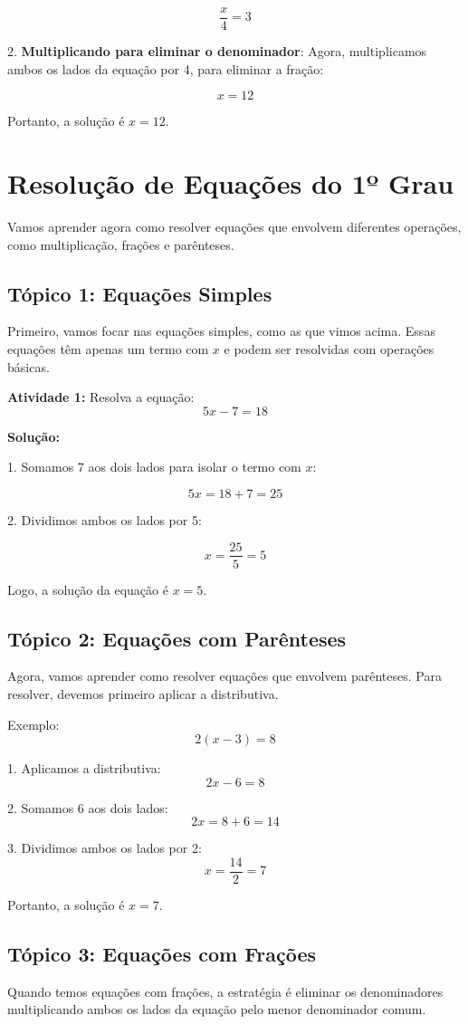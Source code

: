 \documentclass[11pt]{article}
\begin{document}
\begin{multicols}{2}
\[
\frac{x}{4} = 3
\]

2. \textbf{Multiplicando para eliminar o denominador}: Agora, multiplicamos ambos os lados da equação por 4, para eliminar a fração:

\[
x = 12
\]

Portanto, a solução é \(x = 12\).

\section*{Resolução de Equações do 1º Grau}

Vamos aprender agora como resolver equações que envolvem diferentes operações, como multiplicação, frações e parênteses.

\subsection*{Tópico 1: Equações Simples}
Primeiro, vamos focar nas equações simples, como as que vimos acima. Essas equações têm apenas um termo com \(x\) e podem ser resolvidas com operações básicas.

\textbf{Atividade 1:} Resolva a equação:
\[
5x - 7 = 18
\]

\textbf{Solução:}

1. Somamos 7 aos dois lados para isolar o termo com \(x\):

\[
5x = 18 + 7 = 25
\]

2. Dividimos ambos os lados por 5:

\[
x = \frac{25}{5} = 5
\]

Logo, a solução da equação é \(x = 5\).

\subsection*{Tópico 2: Equações com Parênteses}
Agora, vamos aprender como resolver equações que envolvem parênteses. Para resolver, devemos primeiro aplicar a distributiva.

Exemplo:
\[
2(x - 3) = 8
\]

1. Aplicamos a distributiva:
\[
2x - 6 = 8
\]

2. Somamos 6 aos dois lados:
\[
2x = 8 + 6 = 14
\]

3. Dividimos ambos os lados por 2:
\[
x = \frac{14}{2} = 7
\]

Portanto, a solução é \(x = 7\).

\subsection*{Tópico 3: Equações com Frações}
Quando temos equações com frações, a estratégia é eliminar os denominadores multiplicando ambos os lados da equação pelo menor denominador comum.


\end{multicols}
\end{document}
